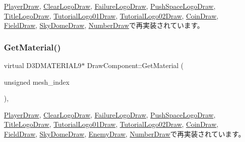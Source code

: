 \mbox{\hyperlink{class_player_draw_af139860a0e62553110f939a62d7b5e8e}{Player\+Draw}}, \mbox{\hyperlink{class_clear_logo_draw_ac0355042ed00a3eff2b30da938ba8776}{Clear\+Logo\+Draw}}, \mbox{\hyperlink{class_failure_logo_draw_aa377e1852cbcda9df1e6d03eaab229c3}{Failure\+Logo\+Draw}}, \mbox{\hyperlink{class_push_space_logo_draw_a6823730591c0243b49171cf82ed0f065}{Push\+Space\+Logo\+Draw}}, \mbox{\hyperlink{class_title_logo_draw_adb7a5b8c8137e1bd3a3553c6045cefd0}{Title\+Logo\+Draw}}, \mbox{\hyperlink{class_tutorial_logo01_draw_a4c5ab0c5fd9b092b7a2e489ef2539a74}{Tutorial\+Logo01\+Draw}}, \mbox{\hyperlink{class_tutorial_logo02_draw_a38a329b442624c0afdf08d91c7932295}{Tutorial\+Logo02\+Draw}}, \mbox{\hyperlink{class_coin_draw_aa3132d69a3dd903e79331b3c4b46ab79}{Coin\+Draw}}, \mbox{\hyperlink{class_field_draw_a06e1621342d80ea696a5fbf54d5d997b}{Field\+Draw}}, \mbox{\hyperlink{class_sky_dome_draw_ac430b3aa2cd7470ac08ea5a9624bf429}{Sky\+Dome\+Draw}}, \mbox{\hyperlink{class_number_draw_a4485821e07841a9d0fe33d5a047ed7d0}{Number\+Draw}}で再実装されています。

\mbox{\label{class_draw_component_adae078d5139f691997763bf6cac9e25a}} 
\subsubsection{\texorpdfstring{Get\+Material()}{GetMaterial()}}
{\footnotesize\ttfamily virtual D3\+D\+M\+A\+T\+E\+R\+I\+A\+L9$\ast$ Draw\+Component\+::\+Get\+Material (\begin{DoxyParamCaption}\item[{unsigned}]{mesh\+\_\+index }\end{DoxyParamCaption})\hspace{0.3cm}{\ttfamily [inline]}, {\ttfamily [virtual]}}



\mbox{\hyperlink{class_player_draw_abcc7b934dbbe08215291dfd1baa2ac31}{Player\+Draw}}, \mbox{\hyperlink{class_clear_logo_draw_a7b91990fdd431ecbc189e8304ca5626d}{Clear\+Logo\+Draw}}, \mbox{\hyperlink{class_failure_logo_draw_a4fbb4cf8cfd42eeefcdf4fbfa9e52d7a}{Failure\+Logo\+Draw}}, \mbox{\hyperlink{class_push_space_logo_draw_a701fe2023e593a2b8662699e8c97c2ea}{Push\+Space\+Logo\+Draw}}, \mbox{\hyperlink{class_title_logo_draw_a346a63d4c6464e5d7564117a3257ae40}{Title\+Logo\+Draw}}, \mbox{\hyperlink{class_tutorial_logo01_draw_a82f716bcb21e3413237aa947ed7c7f51}{Tutorial\+Logo01\+Draw}}, \mbox{\hyperlink{class_tutorial_logo02_draw_a9127cd4fd59a7e03236df177296c849c}{Tutorial\+Logo02\+Draw}}, \mbox{\hyperlink{class_coin_draw_a4582370e7ec4c1259b2a91cc185fbe09}{Coin\+Draw}}, \mbox{\hyperlink{class_field_draw_ae1c720b24a99003a3c413ce0f6dadcb0}{Field\+Draw}}, \mbox{\hyperlink{class_sky_dome_draw_a0afc2d0f6236bb3f9d4edea42737dc1c}{Sky\+Dome\+Draw}}, \mbox{\hyperlink{class_enemy_draw_a081c6a1c8c007b604885e6fbd0ee3641}{Enemy\+Draw}}, \mbox{\hyperlink{class_number_draw_a9454f2a7dab2afd1e981c7cf14329659}{Number\+Draw}}で再実装されています。

